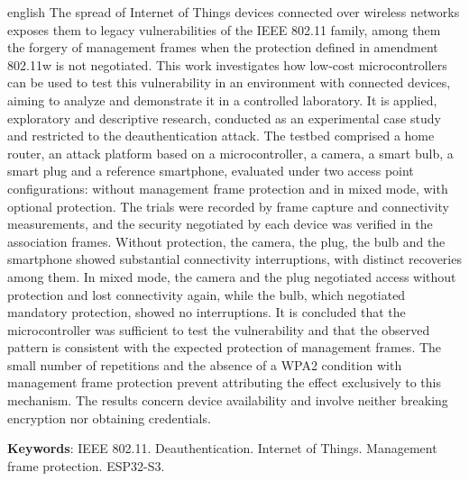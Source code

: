 \begin{resumo}[ABSTRACT]
 \begin{otherlanguage*}{english}
\noindent The spread of Internet of Things devices connected over wireless networks exposes them to legacy vulnerabilities of the IEEE 802.11 family, among them the forgery of management frames when the protection defined in amendment 802.11w is not negotiated. This work investigates how low-cost microcontrollers can be used to test this vulnerability in an environment with connected devices, aiming to analyze and demonstrate it in a controlled laboratory. It is applied, exploratory and descriptive research, conducted as an experimental case study and restricted to the deauthentication attack. The testbed comprised a home router, an attack platform based on a microcontroller, a camera, a smart bulb, a smart plug and a reference smartphone, evaluated under two access point configurations: without management frame protection and in mixed mode, with optional protection. The trials were recorded by frame capture and connectivity measurements, and the security negotiated by each device was verified in the association frames. Without protection, the camera, the plug, the bulb and the smartphone showed substantial connectivity interruptions, with distinct recoveries among them. In mixed mode, the camera and the plug negotiated access without protection and lost connectivity again, while the bulb, which negotiated mandatory protection, showed no interruptions. It is concluded that the microcontroller was sufficient to test the vulnerability and that the observed pattern is consistent with the expected protection of management frames. The small number of repetitions and the absence of a WPA2 condition with management frame protection prevent attributing the effect exclusively to this mechanism. The results concern device availability and involve neither breaking encryption nor obtaining credentials.

  \vspace{\onelineskip}

   \noindent
   \textbf{Keywords}: IEEE 802.11. Deauthentication. Internet of Things. Management frame protection. ESP32-S3.
 \end{otherlanguage*}
\end{resumo}
